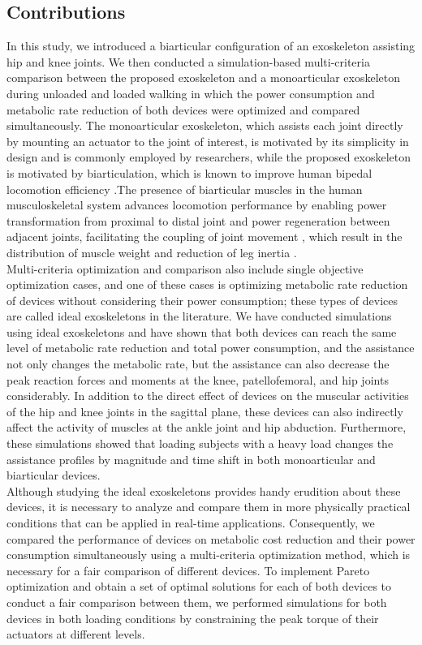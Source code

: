\documentclass[10pt,letterpaper]{article}
\begin{document}
\subsection*{Contributions}
In this study, we introduced a biarticular configuration of an exoskeleton assisting hip and knee joints.  We then conducted a simulation-based multi-criteria comparison between the proposed exoskeleton and a monoarticular exoskeleton during unloaded and loaded walking in which the power consumption and metabolic rate reduction of both devices were optimized and compared simultaneously. The monoarticular exoskeleton, which assists each joint directly by mounting an actuator to the joint of interest, is motivated by its simplicity in design and is commonly employed by researchers, while the proposed exoskeleton is motivated by biarticulation, which is known to improve human bipedal locomotion efficiency \cite{51,52,53}.The presence of biarticular muscles in the human musculoskeletal system advances locomotion performance by enabling power transformation \cite{51,58,59,60,61,62} from proximal to distal joint and power regeneration \cite{65,66} between adjacent joints, facilitating the coupling of joint movement \cite{53,57}, which result in the distribution of muscle weight and reduction of leg inertia \cite{53,57,62}.\\
Multi-criteria optimization and comparison also include single objective optimization cases, and one of these cases is optimizing metabolic rate reduction of devices without considering their power consumption; these types of devices are called ideal exoskeletons in the literature\cite{2,93}.  We have conducted simulations using ideal exoskeletons and have shown that both devices can reach the same level of metabolic rate reduction and total power consumption, and the assistance not only changes the metabolic rate, but the assistance can also decrease the peak reaction forces and moments at the knee, patellofemoral, and hip joints considerably. In addition to the direct effect of devices on the muscular activities of the hip and knee joints in the sagittal plane, these devices can also indirectly affect the activity of muscles at the ankle joint and hip abduction. Furthermore, these simulations showed that loading subjects with a heavy load changes the assistance profiles by magnitude and time shift in both monoarticular and biarticular devices.\\
Although studying the ideal exoskeletons provides handy erudition about these devices, it is necessary to analyze and compare them in more physically practical conditions that can be applied in real-time applications. Consequently, we compared the performance of devices on metabolic cost reduction and their power consumption simultaneously using a multi-criteria optimization method, which is necessary for a fair comparison of different devices. To implement Pareto optimization and obtain a set of optimal solutions for each of both devices to conduct a fair comparison between them, we performed simulations for both devices in both loading conditions by constraining the peak torque of their actuators at different levels. \\
\end{document}
